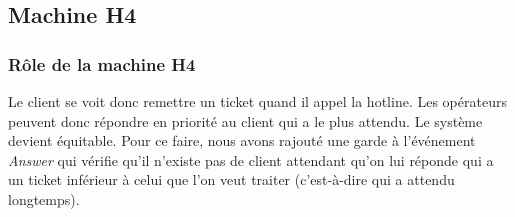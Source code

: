 \documentclass{article}
\begin{document}
   

  \subsection{Machine H4}
  
   \subsubsection{Rôle de la machine H4}
   Le client se voit donc remettre un ticket quand il appel la
   hotline. Les opérateurs peuvent donc répondre en priorité au client
   qui a le plus attendu. Le système devient équitable. Pour ce faire,
   nous avons rajouté une garde à l'événement \emph{Answer} qui vérifie
   qu'il n'existe pas de client attendant qu'on lui réponde qui a un
   ticket inférieur à celui que l'on veut traiter (c'est-à-dire qui a
   attendu longtemps).

   
\end{document}
